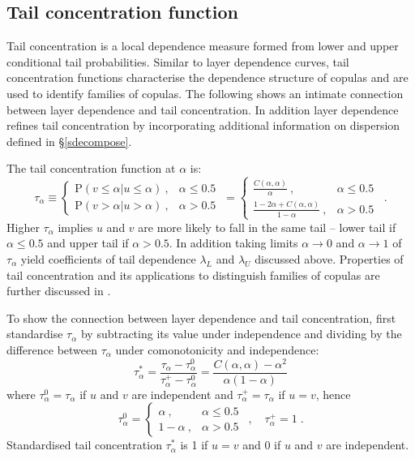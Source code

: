 \documentclass[authoryear]{elsarticle}
\newcommand{\p}{\mathrm{P}}
\newcommand{\cq}{\ ,\quad }
\newcommand{\sref}[1]{\S\ref{#1}}
\begin{document}
\subsection{Tail concentration function}


Tail concentration \citep{venter2002tails} is a local dependence measure formed from lower and upper conditional tail probabilities. Similar to layer dependence curves, tail concentration functions characterise the dependence structure of copulas and are used to identify families of copulas. The following shows an intimate connection between layer dependence and tail concentration. In addition layer dependence refines tail concentration by incorporating additional information on dispersion defined in \sref{sdecompose}.

The tail concentration function at $\alpha$ is:
$$
\tau_\alpha  \equiv \left\{\begin{array}{cc}\p(v\leq \alpha|u\leq \alpha)\ ,  & \alpha\leq 0.5\ \\
\p(v>\alpha|u>\alpha)\ ,& \alpha>0.5 \ \end{array}\right.
=\left\{\begin{array}{cc}\frac{C(\alpha,\alpha)}{\alpha}\ , & \alpha\leq 0.5\ \\
\frac{1-2\alpha+C(\alpha,\alpha)}{1-\alpha}\ ,& \alpha>0.5 \ \end{array}\right. \;.
$$
Higher $\tau_\alpha$ implies $u$ and $v$ are more likely to fall in the same tail -- lower tail if $\alpha\leq 0.5$ and upper tail if $\alpha>0.5$. In addition taking limits $\alpha\rightarrow 0$ and $\alpha\rightarrow 1$ of $\tau_\alpha$ yield coefficients of tail dependence $\lambda_L$ and $\lambda_U$ discussed above. Properties of tail concentration and its applications to distinguish families of copulas are further discussed in \cite{durante2014copulas}.


To show the connection between layer dependence and tail concentration, first standardise $\tau_\alpha$ by subtracting its value under independence and dividing by the difference between $\tau_\alpha$ under comonotonicity and independence:
$$
\tau_\alpha^*=\frac{\tau_\alpha-\tau_\alpha^0}{\tau_\alpha^+-\tau_\alpha^0} = \frac{C(\alpha,\alpha)-\alpha^2}{\alpha(1-\alpha)}
$$
where $\tau_\alpha^0=\tau_\alpha$ if $u$ and $v$ are independent and $\tau_\alpha^+=\tau_\alpha$ if $u=v$, hence
$$
\tau_\alpha^0=\left\{\begin{array}{cc}\alpha \ , & \alpha\leq 0.5\ \\
1-\alpha \ ,& \alpha>0.5 \ \end{array}\right.
\cq
\tau_\alpha^+=1 \;.
$$
Standardised tail concentration $\tau_\alpha^*$ is 1 if $u=v$ and $0$ if $u$ and $v$ are independent. 
\end{document}
